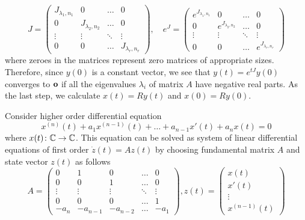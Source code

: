 \begin{equation*}
	J=
	\begin{pmatrix}
		J_{\lambda_1,n_1} & 0 & \ldots & 0 \\
		0 & J_{\lambda_2,n_2} & \ldots & 0 \\
		\vdots & \vdots & \ddots & \vdots \\
		0 & 0 & \ldots & J_{\lambda_r,n_r}
	\end{pmatrix},
	\quad 
	e^J=
	\begin{pmatrix}
		e^{J_{\lambda_1,n_1}} & 0 & \ldots & 0 \\
		0 & e^{J_{\lambda_2,n_2}} & \ldots & 0 \\
		\vdots & \vdots & \ddots & \vdots \\
		0 & 0 & \ldots & e^{J_{\lambda_r,n_r}}
	\end{pmatrix}
\end{equation*}
where zeroes in the matrices represent zero matrices of appropriate sizes. Therefore, since $y(0)$ is a constant vector, we see that $y(t)=e^{tJ}y(0)$ converges to $\textbf{o}$ if all the eigenvalues $\lambda_i$ of matrix $A$ have negative real parts. As the last step, we calculate $x(t)=Ry(t)$ and $x(0)=Ry(0)$.

\begin{example}
	Consider higher order differential equation $$x^{(n)}(t)+a_1x^{(n-1)}(t)+\ldots+a_{n-1}x'(t)+a_nx(t)=0$$ where $x(t)\colon\mathbb{C}\rightarrow\mathbb{C}$. This equation can be solved as system of linear differential equations of first order $\dot{z}(t)=Az(t)$ by choosing fundamental matrix $A$ and state vector $z(t)$ as follows
	\begin{equation*}
		A=
		\begin{pmatrix}
			0 & 1 & 0 & \ldots & 0 \\
			0 & 0 & 1 & \ldots & 0 \\
			\vdots & \vdots & \vdots & \ddots & \vdots \\
			0 & 0 & 0 & \ldots & 1 \\
			-a_n & -a_{n-1} & -a_{n-2} & \ldots & -a_1
		\end{pmatrix}
		, z(t)=
		\begin{pmatrix}
			x(t) \\
			x'(t) \\
			\vdots \\
			x^{(n-1)}(t)
		\end{pmatrix}
	\end{equation*}
\end{example}

